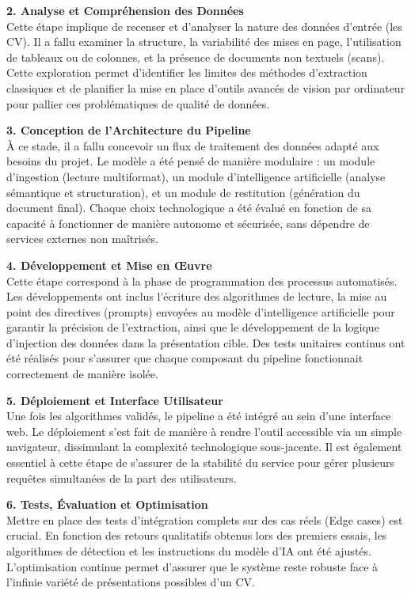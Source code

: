 \textbf{2. Analyse et Compréhension des Données} \\
Cette étape implique de recenser et d'analyser la nature des données d'entrée (les CV). Il a fallu examiner la structure, la variabilité des mises en page, l'utilisation de tableaux ou de colonnes, et la présence de documents non textuels (scans). Cette exploration permet d'identifier les limites des méthodes d'extraction classiques et de planifier la mise en place d'outils avancés de vision par ordinateur pour pallier ces problématiques de qualité de données.

\textbf{3. Conception de l'Architecture du Pipeline} \\
À ce stade, il a fallu concevoir un flux de traitement des données adapté aux besoins du projet. Le modèle a été pensé de manière modulaire : un module d'ingestion (lecture multiformat), un module d'intelligence artificielle (analyse sémantique et structuration), et un module de restitution (génération du document final). Chaque choix technologique a été évalué en fonction de sa capacité à fonctionner de manière autonome et sécurisée, sans dépendre de services externes non maîtrisés.

\textbf{4. Développement et Mise en Œuvre} \\
Cette étape correspond à la phase de programmation des processus automatisés. Les développements ont inclus l'écriture des algorithmes de lecture, la mise au point des directives (prompts) envoyées au modèle d'intelligence artificielle pour garantir la précision de l'extraction, ainsi que le développement de la logique d'injection des données dans la présentation cible. Des tests unitaires continus ont été réalisés pour s'assurer que chaque composant du pipeline fonctionnait correctement de manière isolée.

\textbf{5. Déploiement et Interface Utilisateur} \\
Une fois les algorithmes validés, le pipeline a été intégré au sein d'une interface web. Le déploiement s'est fait de manière à rendre l'outil accessible via un simple navigateur, dissimulant la complexité technologique sous-jacente. Il est également essentiel à cette étape de s'assurer de la stabilité du service pour gérer plusieurs requêtes simultanées de la part des utilisateurs.

\textbf{6. Tests, Évaluation et Optimisation} \\
Mettre en place des tests d'intégration complets sur des cas réels (Edge cases) est crucial. En fonction des retours qualitatifs obtenus lors des premiers essais, les algorithmes de détection et les instructions du modèle d'IA ont été ajustés. L'optimisation continue permet d'assurer que le système reste robuste face à l'infinie variété de présentations possibles d'un CV.


